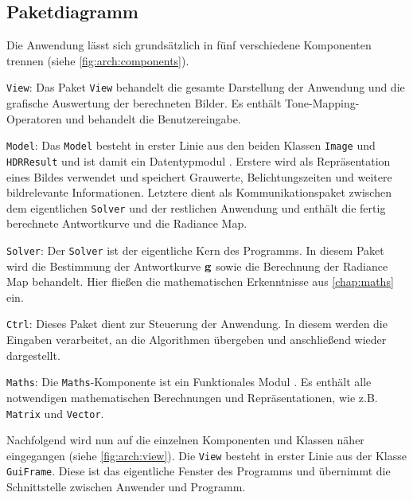 \subsection{Paketdiagramm}
Die Anwendung lässt sich grundsätzlich in fünf verschiedene Komponenten trennen (siehe \autoref{fig:arch:components}). 
\begin{description}

\item{\texttt{View}:} Das Paket \texttt{View} behandelt die gesamte Darstellung der Anwendung und die grafische Auswertung der berechneten Bilder. Es enthält \gls{Tone-Mapping}-Operatoren und behandelt die Benutzereingabe.

\item{\texttt{Model}:} Das \texttt{Model} besteht in erster Linie aus den beiden Klassen \texttt{Image} und \texttt{HDRResult} und ist damit ein Datentypmodul \cite[S. 412]{ludewig}. Erstere wird als Repräsentation eines Bildes verwendet und speichert Grauwerte, Belichtungszeiten und weitere bildrelevante Informationen. Letztere dient als Kommunikationspaket zwischen dem eigentlichen \texttt{Solver} und der restlichen Anwendung und enthält die fertig berechnete Antwortkurve und die \gls{Radiance Map}.

\item{\texttt{Solver}:} Der \texttt{Solver} ist der eigentliche Kern des Programms. In diesem Paket wird die Bestimmung der Antwortkurve $\mathbf g$ sowie die Berechnung der \gls{Radiance Map} behandelt. Hier fließen die mathematischen Erkenntnisse aus \autoref{chap:maths} ein.

\item{\texttt{Ctrl}:} Dieses Paket dient zur Steuerung der Anwendung. In diesem werden die Eingaben verarbeitet, an die Algorithmen übergeben und anschließend wieder dargestellt.

\item{\texttt{Maths}:} Die \texttt{Maths}-Komponente ist ein Funktionales Modul \cite[S. 412]{ludewig}. Es enthält alle notwendigen mathematischen Berechnungen und Repräsentationen, wie z.B. \texttt{Matrix} und \texttt{Vector}.
\end{description}


Nachfolgend wird nun auf die einzelnen Komponenten und Klassen näher eingegangen (siehe \autoref{fig:arch:view}). Die \texttt{View} besteht in erster Linie aus der Klasse \texttt{GuiFrame}. Diese ist das eigentliche Fenster des Programms und übernimmt die Schnittstelle zwischen Anwender und Programm. 

